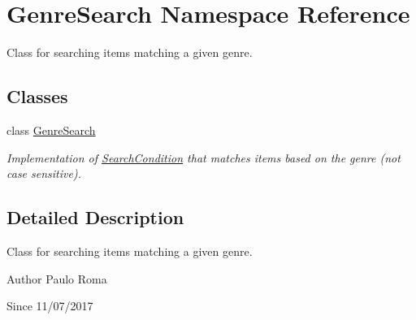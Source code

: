 \hypertarget{namespaceGenreSearch}{}\section{Genre\+Search Namespace Reference}
\label{namespaceGenreSearch}


Class for searching items matching a given genre.  


\subsection*{Classes}
\begin{DoxyCompactItemize}
\item 
class \hyperlink{classGenreSearch_1_1GenreSearch}{Genre\+Search}
\begin{DoxyCompactList}\small\item\em Implementation of \hyperlink{namespaceSearchCondition}{Search\+Condition} that matches items based on the genre (not case sensitive). \end{DoxyCompactList}\end{DoxyCompactItemize}


\subsection{Detailed Description}
Class for searching items matching a given genre. 

\begin{DoxyAuthor}{Author}
Paulo Roma 
\end{DoxyAuthor}
\begin{DoxySince}{Since}
11/07/2017 
\end{DoxySince}
